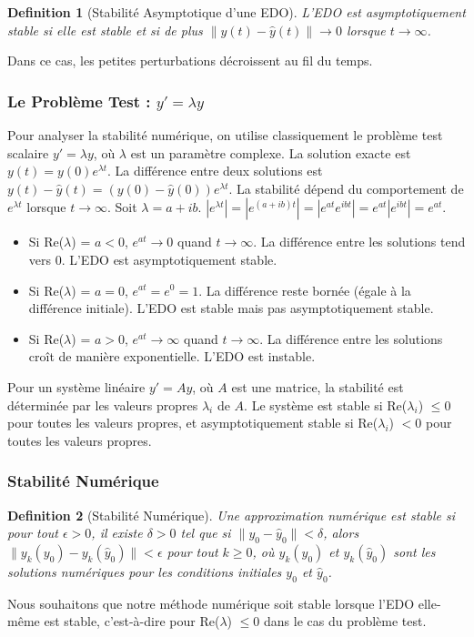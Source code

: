 \documentclass{article}
\newtheorem{definition}{Definition}
\begin{document}
\begin{definition}[Stabilité Asymptotique d'une EDO]
L'EDO est asymptotiquement stable si elle est stable et si de plus $\|y(t) - \hat{y}(t)\| \to 0$ lorsque $t \to \infty$.
\end{definition}
Dans ce cas, les petites perturbations décroissent au fil du temps.

\subsubsection*{Le Problème Test : $y' = \lambda y$}

Pour analyser la stabilité numérique, on utilise classiquement le problème test scalaire $y' = \lambda y$, où $\lambda$ est un paramètre complexe. La solution exacte est $y(t) = y(0) e^{\lambda t}$. La différence entre deux solutions est $y(t) - \hat{y}(t) = (y(0) - \hat{y}(0)) e^{\lambda t}$. La stabilité dépend du comportement de $e^{\lambda t}$ lorsque $t \to \infty$. Soit $\lambda = a + ib$. $|e^{\lambda t}| = |e^{(a+ib)t}| = |e^{at} e^{ibt}| = e^{at} |e^{ibt}| = e^{at}$.
\begin{itemize}
    \item Si Re($\lambda$) = $a < 0$, $e^{at} \to 0$ quand $t \to \infty$. La différence entre les solutions tend vers 0. L'EDO est asymptotiquement stable.
    \item Si Re($\lambda$) = $a = 0$, $e^{at} = e^0 = 1$. La différence reste bornée (égale à la différence initiale). L'EDO est stable mais pas asymptotiquement stable.
    \item Si Re($\lambda$) = $a > 0$, $e^{at} \to \infty$ quand $t \to \infty$. La différence entre les solutions croît de manière exponentielle. L'EDO est instable.
\end{itemize}

Pour un système linéaire $y' = Ay$, où $A$ est une matrice, la stabilité est déterminée par les valeurs propres $\lambda_i$ de $A$. Le système est stable si Re($\lambda_i$) $\le 0$ pour toutes les valeurs propres, et asymptotiquement stable si Re($\lambda_i$) $< 0$ pour toutes les valeurs propres.

\subsubsection*{Stabilité Numérique}

\begin{definition}[Stabilité Numérique]
Une approximation numérique est stable si pour tout $\epsilon > 0$, il existe $\delta > 0$ tel que si $\|y_0 - \hat{y}_0\| < \delta$, alors $\|y_k(y_0) - y_k(\hat{y}_0)\| < \epsilon$ pour tout $k \ge 0$, où $y_k(y_0)$ et $y_k(\hat{y}_0)$ sont les solutions numériques pour les conditions initiales $y_0$ et $\hat{y}_0$.
\end{definition}
Nous souhaitons que notre méthode numérique soit stable lorsque l'EDO elle-même est stable, c'est-à-dire pour Re($\lambda$) $\le 0$ dans le cas du problème test.
\end{document}
